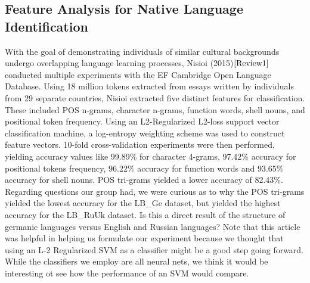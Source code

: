 \documentclass[12pt]{article}
\newcommand\tab[1][1cm]{\hspace*{#1}}
\begin{document}
\subsection{Feature Analysis for Native Language Identification}
\tab With the goal of demonstrating individuals of similar cultural backgrounds undergo overlapping language learning processes, Nisioi (2015)$\cite{Review1}$ conducted multiple experiments with the EF Cambridge Open Language Database. Using 18 million tokens extracted from essays written by individuals from 29 separate countries, Nisioi extracted five distinct features for classification. These included POS n-grams, character n-grams, function words, shell nouns, and positional token frequency. Using an L2-Regularized L2-loss support vector classification machine, a log-entropy weighting scheme was used to construct feature vectors. 10-fold cross-validation experiments were then performed, yielding accuracy values like 99.89\% for character 4-grams, 97.42\% accuracy for positional tokens frequency, 96.22\% accuracy for function words and 93.65\% accuracy for shell nouns. POS tri-grams yielded a lower accuracy of 82.43\%. Regarding questions our group had, we were curious as to why the POS tri-grams yielded the lowest accuracy for the LB\_Ge dataset, but yielded the highest accuracy for the LB\_RuUk dataset. Is this a direct result of the structure of germanic languages versus English and Russian languages? Note that this article was helpful in helping us formulate our experiment because we thought that using an L-2 Regularized SVM as a classifier might be a good step going forward. While the classifiers we employ are all neural nets, we think it would be interesting ot see how the performance of an SVM would compare. 
 
\end{document}
